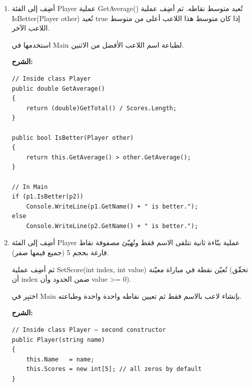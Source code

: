 \documentclass[14pt]{extarticle}
\begin{document}
\begin{enumerate}
\ifwithsols
\textbf{الشرح:}
\begin{english}
{\small
\begin{verbatim}
// Inside class Player
public int GetBest()
{
    int best = Scores[0];
    for (int i = 1; i < Scores.Length; i++)
        if (Scores[i] > best)
            best = Scores[i];
    return best;
}

// In Main
Console.WriteLine(p1.GetName() + " best: " + p1.GetBest());
Console.WriteLine(p2.GetName() + " best: " + p2.GetBest());
\end{verbatim}
}
\end{english}
\clearpage
\fi

\item
أضِف إلى الفئة \textenglish{Player} عملية \textenglish{GetAverage()} تُعيد متوسط نقاطه.
ثم أضِف عملية \textenglish{IsBetter(Player other)} تُعيد \textenglish{true} إذا كان
متوسط هذا اللاعب أعلى من متوسط اللاعب الآخر.

استخدمها في \textenglish{Main} لطباعة اسم اللاعب الأفضل من الاثنين.

\ifwithsols
\textbf{الشرح:}
\begin{english}
{\small
\begin{verbatim}
// Inside class Player
public double GetAverage()
{
    return (double)GetTotal() / Scores.Length;
}

public bool IsBetter(Player other)
{
    return this.GetAverage() > other.GetAverage();
}

// In Main
if (p1.IsBetter(p2))
    Console.WriteLine(p1.GetName() + " is better.");
else
    Console.WriteLine(p2.GetName() + " is better.");
\end{verbatim}
}
\end{english}
\clearpage
\fi

\item
أضِف إلى الفئة \textenglish{Player} عملية بنّاءة ثانية تتلقى الاسم فقط
وتُهيّئ مصفوفة نقاط فارغة بحجم \textenglish{5} (جميع قيمها صفر).

ثم أضِف عملية \textenglish{SetScore(int index, int value)} تُعيّن نقطة
في مباراة معيّنة (تحقّق أن \textenglish{index} ضمن الحدود وأن \textenglish{value >= 0}).

اختبِر في \textenglish{Main} بإنشاء لاعب بالاسم فقط ثم تعيين نقاطه واحدة واحدة وطباعته.

\ifwithsols
\textbf{الشرح:}
\begin{english}
{\small
\begin{verbatim}
// Inside class Player — second constructor
public Player(string name)
{
    this.Name   = name;
    this.Scores = new int[5]; // all zeros by default
}


\end{verbatim}}
\end{english}
\end{enumerate}
\end{document}
